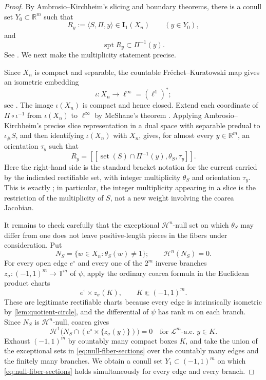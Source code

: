 \documentclass[11pt]{article}
\theoremstyle{remark}
\newcommand{\I}{\mathbf I}
\newcommand{\Hh}{\mathcal H}
\newcommand{\set}{\operatorname{set}}
\newcommand{\spt}{\operatorname{spt}}
\newcommand{\llbracket}{[\![}
\newcommand{\rrbracket}{]\!]}
\begin{document}
\begin{proof}
By Ambrosio--Kirchheim's slicing and boundary theorems, there is a conull
set $Y_0\subset\mathbb R^m$ such that
\[
       R_y:=\langle S,\Pi,y\rangle\in\I_1(X_n)
       \qquad (y\in Y_0),
\]
and
\begin{equation}\label{eq:slice-carrier}
       \spt R_y\subset \Pi^{-1}(y).
\end{equation}
See \cite[Theorems~5.6--5.7]{AK00}. We next make the multiplicity statement
precise.

Since $X_n$ is compact and separable, the countable
Fr\'echet--Kuratowski map gives an isometric embedding
\[
       \iota:X_n\longrightarrow \ell^\infty=(\ell^1)^*;
\]
see \cite{BBI01}. The image $\iota(X_n)$ is compact and hence closed.
Extend each coordinate of $\Pi\circ\iota^{-1}$ from $\iota(X_n)$ to
$\ell^\infty$ by McShane's theorem \cite{McShane34}. Applying
Ambrosio--Kirchheim's precise slice representation in a dual space with
separable predual to $\iota_\#S$, and then identifying $\iota(X_n)$ with
$X_n$, gives, for almost every $y\in\mathbb R^m$, an orientation $\tau_y$
such that
\begin{equation}\label{eq:precise-slice}
 R_y
 =\llbracket
      \set(S)\cap\Pi^{-1}(y),\theta_S,\tau_y
   \rrbracket.
\end{equation}
Here the right-hand side is the standard bracket notation for the current
carried by the indicated rectifiable set, with integer multiplicity
$\theta_S$ and orientation $\tau_y$.
This is exactly \cite[Theorem~9.7]{AK00}; in particular, the integer
multiplicity appearing in a slice is the restriction of the multiplicity
of $S$, not a new weight involving the coarea Jacobian.

It remains to check carefully that the exceptional $\Hh^n$-null set on
which $\theta_S$ may differ from one does not leave positive-length pieces
in the fibers under consideration. Put
\[
       N_S=\{w\in X_n:\theta_S(w)\ne1\};
       \qquad \Hh^n(N_S)=0.
\]
For every open edge $e^\circ$ and every one of the $2^m$ inverse branches
$z_\sigma:(-1,1)^m\to\mathbb T^m$ of $\psi$, apply the ordinary coarea
formula \cite[3.2.22]{Federer69} in the Euclidean product charts
\[
       e^\circ\times z_\sigma(K),
       \qquad K\Subset(-1,1)^m.
\]
These are legitimate rectifiable charts because every edge is intrinsically
isometric by \cref{lem:quotient-circle}, and the differential of $\psi$ has
rank $m$ on each branch. Since $N_S$ is $\Hh^n$-null, coarea gives
\begin{equation}\label{eq:null-fiber-sections}
 \Hh^1\bigl(
    N_S\cap(e^\circ\times\{z_\sigma(y)\})
 \bigr)=0
 \quad\text{for $\mathcal L^m$-a.e. }y\in K.
\end{equation}
Exhaust $(-1,1)^m$ by countably many compact boxes $K$, and take the union
of the exceptional sets in \eqref{eq:null-fiber-sections} over the
countably many edges and the finitely many branches. We obtain a conull set
$Y_1\subset(-1,1)^m$ on which \eqref{eq:null-fiber-sections} holds
simultaneously for every edge and every branch.


\end{proof}
\end{document}
